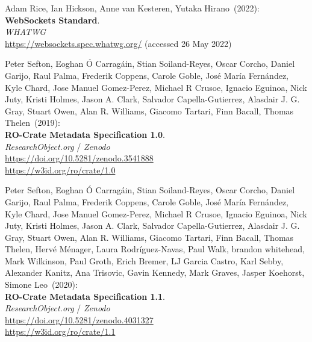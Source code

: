\begin{thebibliography}{9}
Adam Rice, Ian Hickson, Anne van Kesteren, Yutaka Hirano~(2022): \\
\textbf{WebSockets Standard}. \\
\emph{WHATWG}\\
\url{https://websockets.spec.whatwg.org/}
(accessed 26 May 2022)

Peter Sefton, Eoghan Ó Carragáin, Stian Soiland-Reyes, Oscar
Corcho, Daniel Garijo, Raul Palma, Frederik Coppens, Carole Goble, José
María Fernández, Kyle Chard, Jose Manuel Gomez-Perez, Michael R Crusoe,
Ignacio Eguinoa, Nick Juty, Kristi Holmes, Jason A. Clark, Salvador
Capella-Gutierrez, Alasdair J. G. Gray, Stuart Owen, Alan R. Williams,
Giacomo Tartari, Finn Bacall, Thomas Thelen~(2019): \\
\textbf{RO-Crate Metadata Specification 1.0}.\\
\emph{ResearchObject.org} / \emph{Zenodo}\\
\url{https://doi.org/10.5281/zenodo.3541888}\\
\url{https://w3id.org/ro/crate/1.0}

Peter Sefton, Eoghan Ó Carragáin, Stian Soiland-Reyes, Oscar
Corcho, Daniel Garijo, Raul Palma, Frederik Coppens, Carole Goble, José
María Fernández, Kyle Chard, Jose Manuel Gomez-Perez, Michael R Crusoe,
Ignacio Eguinoa, Nick Juty, Kristi Holmes, Jason A. Clark, Salvador
Capella-Gutierrez, Alasdair J. G. Gray, Stuart Owen, Alan R. Williams,
Giacomo Tartari, Finn Bacall, Thomas Thelen, Hervé Ménager, Laura
Rodríguez-Navas, Paul Walk, brandon whitehead, Mark Wilkinson, Paul
Groth, Erich Bremer, LJ Garcia Castro, Karl Sebby, Alexander Kanitz, Ana
Trisovic, Gavin Kennedy, Mark Graves, Jasper Koehorst, Simone Leo~(2020): \\
\textbf{RO-Crate Metadata Specification 1.1}.\\
\emph{ResearchObject.org} / \emph{Zenodo}\\
\url{https://doi.org/10.5281/zenodo.4031327}\\
\url{https://w3id.org/ro/crate/1.1}


\end{thebibliography}
